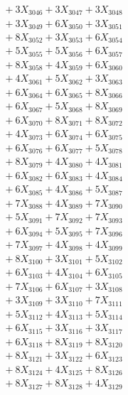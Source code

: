 \documentclass[a4paper,10pt]{article}
\begin{document}
{\begin{align}
&\;  + 3 X_{3046} + 3 X_{3047} + 3 X_{3048} \\[0.3ex]
&\;  + 3 X_{3049} + 6 X_{3050} + 3 X_{3051} \\[0.3ex]
&\;  + 8 X_{3052} + 3 X_{3053} + 6 X_{3054} \\[0.3ex]
&\;  + 5 X_{3055} + 5 X_{3056} + 6 X_{3057} \\[0.3ex]
&\;  + 8 X_{3058} + 4 X_{3059} + 6 X_{3060} \\[0.3ex]
&\;  + 4 X_{3061} + 5 X_{3062} + 3 X_{3063} \\[0.3ex]
&\;  + 6 X_{3064} + 6 X_{3065} + 8 X_{3066} \\[0.3ex]
&\;  + 6 X_{3067} + 5 X_{3068} + 8 X_{3069} \\[0.5ex]\allowbreak
&\;  + 6 X_{3070} + 8 X_{3071} + 8 X_{3072} \\[0.3ex]
&\;  + 4 X_{3073} + 6 X_{3074} + 6 X_{3075} \\[0.3ex]
&\;  + 6 X_{3076} + 6 X_{3077} + 5 X_{3078} \\[0.3ex]
&\;  + 8 X_{3079} + 4 X_{3080} + 4 X_{3081} \\[0.3ex]
&\;  + 6 X_{3082} + 6 X_{3083} + 4 X_{3084} \\[0.3ex]
&\;  + 6 X_{3085} + 4 X_{3086} + 5 X_{3087} \\[0.3ex]
&\;  + 7 X_{3088} + 4 X_{3089} + 7 X_{3090} \\[0.3ex]
&\;  + 5 X_{3091} + 7 X_{3092} + 7 X_{3093} \\[0.3ex]
&\;  + 6 X_{3094} + 5 X_{3095} + 7 X_{3096} \\[0.3ex]
&\;  + 7 X_{3097} + 4 X_{3098} + 4 X_{3099} \\[0.5ex]\allowbreak
&\;  + 8 X_{3100} + 3 X_{3101} + 5 X_{3102} \\[0.3ex]
&\;  + 6 X_{3103} + 4 X_{3104} + 6 X_{3105} \\[0.3ex]
&\;  + 7 X_{3106} + 6 X_{3107} + 3 X_{3108} \\[0.3ex]
&\;  + 3 X_{3109} + 3 X_{3110} + 7 X_{3111} \\[0.3ex]
&\;  + 5 X_{3112} + 4 X_{3113} + 5 X_{3114} \\[0.3ex]
&\;  + 6 X_{3115} + 3 X_{3116} + 3 X_{3117} \\[0.3ex]
&\;  + 6 X_{3118} + 8 X_{3119} + 8 X_{3120} \\[0.3ex]
&\;  + 8 X_{3121} + 3 X_{3122} + 6 X_{3123} \\[0.3ex]
&\;  + 8 X_{3124} + 4 X_{3125} + 8 X_{3126} \\[0.3ex]
&\;  + 8 X_{3127} + 8 X_{3128} + 4 X_{3129} \\[0.5ex]\allowbreak

\end{align}}
\end{document}

